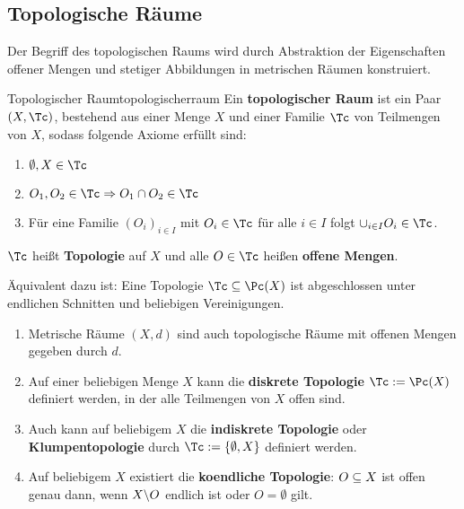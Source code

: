 \subsection{Topologische Räume}
\label{subsec:topologischeraeume}
Der Begriff des topologischen Raums wird durch Abstraktion der Eigenschaften offener Mengen und stetiger Abbildungen in metrischen Räumen konstruiert.
\begin{definition}{Topologischer Raum}{topologischerraum}
Ein \textbf{topologischer Raum} ist ein Paar $(X, \Tc)$, bestehend aus einer Menge $X$ und einer Familie $\Tc$ von Teilmengen von $X$, sodass folgende Axiome erfüllt sind:
\begin{enumerate}[({O}1)]
\item $\emptyset, X \in \Tc$
\item $O_1, O_2 \in \Tc \implies O_1 \cap O_2 \in \Tc$
\item Für eine Familie $(O_i)_{i \in I}$ mit $O_i \in \Tc$ für alle $i \in I$ folgt $\cup_{i \in I} O_i \in \Tc$.
\end{enumerate}
$\Tc$ heißt \textbf{Topologie} auf $X$ und alle $O \in \Tc$ heißen \textbf{offene Mengen}.
\end{definition}
\begin{bemerkung}
Äquivalent dazu ist: Eine Topologie $\Tc \sub \Pc(X)$ ist abgeschlossen unter endlichen Schnitten und beliebigen Vereinigungen. 
\end{bemerkung}
\begin{beispiele}
\begin{enumerate}
\item Metrische Räume $(X,d)$ sind auch topologische Räume mit offenen Mengen gegeben durch $d$.
\item Auf einer beliebigen Menge $X$ kann die \textbf{diskrete Topologie} $\Tc := \Pc(X)$ definiert werden, in der alle Teilmengen von $X$ offen sind.
\item Auch kann auf beliebigem $X$ die \textbf{indiskrete Topologie} oder \textbf{Klumpentopologie} durch $\Tc := \{\emptyset, X\}$ definiert werden.
\item Auf beliebigem $X$ existiert die \textbf{koendliche Topologie}: $O\subseteq X$ ist offen genau dann, wenn $X \backslash O$ endlich ist oder $O = \emptyset$ gilt.
\end{enumerate}
\end{beispiele}
